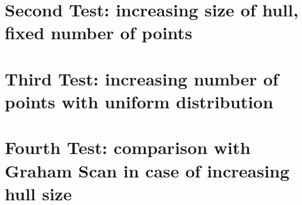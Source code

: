 \documentclass[
12pt,
a4paper,
oneside,
headinclude,
footinclude]{report}
\theoremstyle{definition} %
\begin{document}
\section{\textbf{Second Test:} increasing size of hull, fixed number of points}
\lipsum[1]
\section{\textbf{Third Test:} increasing number of points with uniform distribution}
\lipsum[1]
\section{\textbf{Fourth Test:} comparison with Graham Scan in case of increasing hull size}
\lipsum[1]




\end{document}
